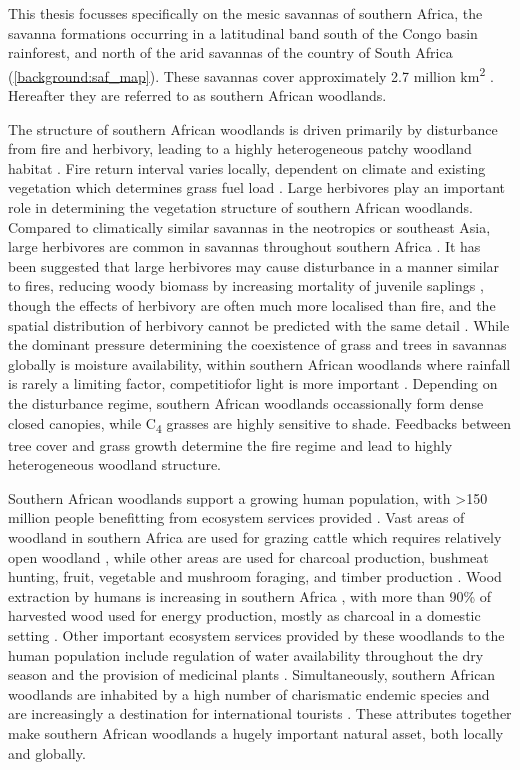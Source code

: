 \begin{refsection}
This thesis focusses specifically on the mesic savannas of southern Africa, the savanna formations occurring in a latitudinal band south of the Congo basin rainforest, and north of the arid savannas of the country of South Africa (\autoref{background:saf_map}). These savannas cover approximately 2.7 million km\textsuperscript{2} \citep{Arino2010}. Hereafter they are referred to as southern African woodlands.

The structure of southern African woodlands is driven primarily by disturbance from fire and herbivory, leading to a highly heterogeneous patchy woodland habitat \citep{Archibald2019}. Fire return interval varies locally, dependent on climate and existing vegetation which determines grass fuel load \citep{Archibald2010}. Large herbivores play an important role in determining the vegetation structure of southern African woodlands. Compared to climatically similar savannas in the neotropics or southeast Asia, large herbivores are common in savannas throughout southern Africa \citep{Asner2009}. It has been suggested that large herbivores may cause disturbance in a manner similar to fires, reducing woody biomass by increasing mortality of juvenile saplings \citep{Bond2005}, though the effects of herbivory are often much more localised than fire, and the spatial distribution of herbivory cannot be predicted with the same detail \citep{Hempson2015}. While the dominant pressure determining the coexistence of grass and trees in savannas globally is moisture availability, within southern African woodlands where rainfall is rarely a limiting factor, competitiofor light is more important \citep{Vadigi2013}. Depending on the disturbance regime, southern African woodlands occassionally form dense closed canopies, while C\textsubscript{4} grasses are highly sensitive to shade. Feedbacks between tree cover and grass growth determine the fire regime and lead to highly heterogeneous woodland structure.

Southern African woodlands support a growing human population, with >150 million people benefitting from ecosystem services provided \citep{Ryan2016, Wunder2014}. Vast areas of woodland in southern Africa are used for grazing cattle which requires relatively open woodland \citep{Njana2013}, while other areas are used for charcoal production, bushmeat hunting, fruit, vegetable and mushroom foraging, and timber production \citep{Ryan2016}. Wood extraction by humans is increasing in southern Africa \citep{Hansen2013}, with more than 90\% of harvested wood used for energy production, mostly as charcoal in a domestic setting \citep{May-Tobin2011}. Other important ecosystem services provided by these woodlands to the human population include regulation of water availability throughout the dry season \citep{Wilk2010, Hecky2003} and the provision of medicinal plants \citep{Ryan2016, Augustino2011}. Simultaneously, southern African woodlands are inhabited by a high number of charismatic endemic species \citep{Burgess2004} and are increasingly a destination for international tourists \citep{Vergles2015, Shackleton2007}. These attributes together make southern African woodlands a hugely important natural asset, both locally and globally.


\end{refsection}
